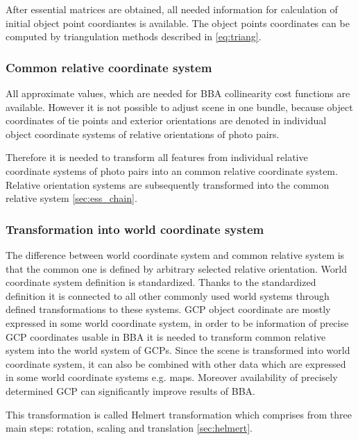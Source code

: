 \documentclass[a4paper,12pt]{article}
\begin{document}
After essential matrices are obtained, all needed information for calculation of initial object point coordiantes
is  available. The object points coordinates can be computed by triangulation methods described in \ref{eq:triang}.


\subsubsection{Common relative coordinate system}

All approximate values, which are needed for BBA collinearity cost functions are available. 
However it is not possible to adjust scene in one bundle, because
object coordinates of tie points and exterior orientations are denoted in  individual object coordinate systems
of relative orientations of photo pairs.

Therefore it is needed to transform all features from individual relative coordinate systems of photo pairs into 
an common relative coordinate system.
Relative orientation systems are subsequently transformed into the common relative system \ref{sec:ess_chain}. 

\subsubsection{Transformation into world coordinate system}

The difference between world coordinate system and common relative system is that the common one 
is defined by arbitrary selected relative orientation. World coordinate system definition is standardized.
Thanks to the standardized definition it is connected to all other commonly used  world systems through 
defined transformations to these systems.
GCP object coordinate are mostly expressed in some world coordinate system, in order to be 
information of precise GCP coordinates usable in BBA it is needed to transform common relative 
system into the world system of GCPs. Since the scene is transformed into world coordinate system,
it can also be combined with other data which are expressed in some world coordinate systems e.g.
maps. Moreover availability of precisely determined GCP can significantly improve results of BBA.  


This transformation is called Helmert  transformation which comprises from 
three main steps: rotation, scaling and translation \ref{sec:helmert}.
\end{document}
